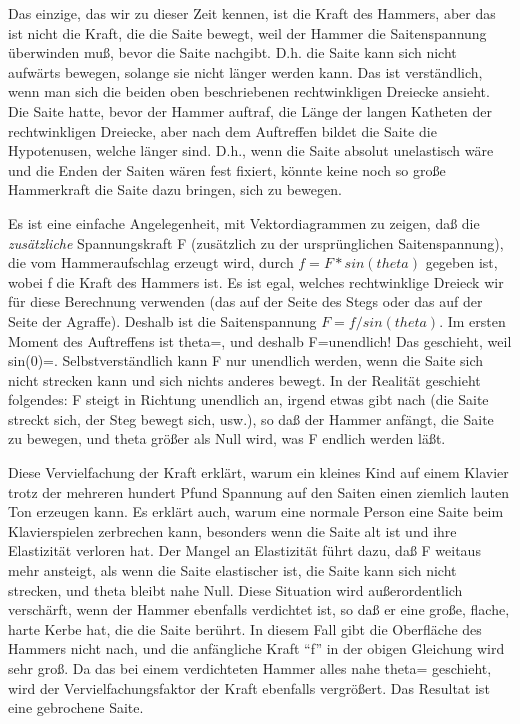 Das einzige, das wir zu dieser Zeit kennen, ist die Kraft des Hammers, aber das ist nicht die Kraft, die die Saite bewegt, weil der Hammer die Saitenspannung überwinden muß, bevor die Saite nachgibt.
 D.h. die Saite kann sich nicht aufwärts bewegen, solange sie nicht länger werden kann.
 Das ist verständlich, wenn man sich die beiden oben beschriebenen rechtwinkligen Dreiecke ansieht.
 Die Saite hatte, bevor der Hammer auftraf, die Länge der langen Katheten der rechtwinkligen Dreiecke, aber nach dem Auftreffen bildet die Saite die Hypotenusen, welche länger sind.
 D.h., wenn die Saite absolut unelastisch wäre und die Enden der Saiten wären fest fixiert, könnte keine noch so große Hammerkraft die Saite dazu bringen, sich zu bewegen.
 

Es ist eine einfache Angelegenheit, mit Vektordiagrammen zu zeigen, daß die \textit{zusätzliche} Spannungskraft F (zusätzlich zu der ursprünglichen Saitenspannung), die vom Hammeraufschlag erzeugt wird, durch $f=F*sin(theta)$ gegeben ist, wobei f die Kraft des Hammers ist.
 Es ist egal, welches rechtwinklige Dreieck wir für diese Berechnung verwenden (das auf der Seite des Stegs oder das auf der Seite der Agraffe).
 Deshalb ist die Saitenspannung $F=f/sin(theta)$.
 Im ersten Moment des Auftreffens ist theta\nolinebreak=, und deshalb F\nolinebreak=\nolinebreak unendlich!
 Das geschieht, weil sin(0)\nolinebreak=.
 Selbstverständlich kann F nur unendlich werden, wenn die Saite sich nicht strecken kann und sich nichts anderes bewegt.
 In der Realität geschieht folgendes: F steigt in Richtung unendlich an, irgend etwas gibt nach (die Saite streckt sich, der Steg bewegt sich, usw.), so daß der Hammer anfängt, die Saite zu bewegen, und theta größer als Null wird, was F endlich werden läßt.
 

Diese Vervielfachung der Kraft erklärt, warum ein kleines Kind auf einem Klavier trotz der mehreren hundert Pfund Spannung auf den Saiten einen ziemlich lauten Ton erzeugen kann.
 Es erklärt auch, warum eine normale Person eine Saite beim Klavierspielen zerbrechen kann, besonders wenn die Saite alt ist und ihre Elastizität verloren hat.
 Der Mangel an Elastizität führt dazu, daß F weitaus mehr ansteigt, als wenn die Saite elastischer ist, die Saite kann sich nicht strecken, und theta bleibt nahe Null.
 Diese Situation wird außerordentlich verschärft, wenn der Hammer ebenfalls verdichtet ist, so daß er eine große, flache, harte Kerbe hat, die die Saite berührt.
 In diesem Fall gibt die Oberfläche des Hammers nicht nach, und die anfängliche Kraft \enquote{f} in der obigen Gleichung wird sehr groß.
 Da das bei einem verdichteten Hammer alles nahe theta\nolinebreak= geschieht, wird der Vervielfachungsfaktor der Kraft ebenfalls vergrößert.
 Das Resultat ist eine gebrochene Saite.
 

